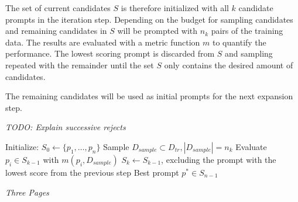 The set of current candidates $S$ is therefore initialized with all $k$ candidate prompts in the iteration step. Depending on the budget for sampling candidates and remaining candidates in $S$ will be prompted with $n_k$ pairs of the training data. The results are evaluated with a metric function $m$ to quantify the performance. The lowest scoring prompt is discarded from $S$ and sampling repeated with the remainder until the set $S$ only contains the desired amount of candidates.

The remaining candidates will be used as initial prompts for the next expansion step.

\textit{TODO: Explain successive rejects}

\begin{algorithm}
\caption{}
\begin{algorithmic}[1]
    \State Initialize: $S_0 \gets \{p_1, \dots , p_n\}$
        \State Sample $D_{sample} \subset D_{tr}, |D_{sample}| = n_k$
        \State Evaluate $p_i \in S_{k−1}$ with $m(p_i, D_{sample})$
        \State $S_k \gets S_{k−1}$, excluding the prompt with the lowest score from the previous step
    \EndFor
    \State \Return Best prompt $p^* \in S_{n-1}$
\end{algorithmic}
\end{algorithm}


\textit{Three Pages}